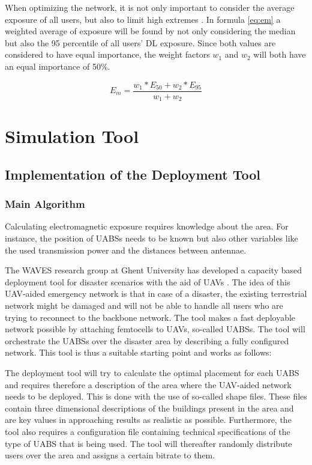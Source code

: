 When optimizing the network, it is not only important to consider the average exposure of all users, but also to limit high extremes \cite{J1}. 
In formula \ref{eq:em} a weighted average of exposure will be found by not only considering the median but also the 95 percentile of all users' DL exposure.
Since both values are considered to have equal importance, the weight factors $w_1$ and $w_2$ will both have an equal importance of 50\%. 

\begin{equation} 
E_m = \frac{w_1 * E_{50} + w_2 * E_{95}}{w_1 + w_2}
\label{eq:em}
\end{equation}


\section{Simulation Tool}

\subsection{Implementation of the Deployment Tool}
\label{sec:implementation:deploymenttool}
\subsubsection{Main Algorithm}

Calculating electromagnetic exposure requires knowledge about the area. 
For instance, the position of \gls{UABS}s needs to be known but also  other variables like
 the used transmission power and the distances between antennae.

The WAVES research group at Ghent University has developed a capacity based deployment tool for disaster scenarios with the aid of UAVs \cite{J2}.
The idea of this UAV-aided emergency network is that in case of a disaster, the existing terrestrial network might be damaged and will not be able 
to handle all users who are trying to reconnect to the backbone network. 
The tool makes a fast deployable network possible by attaching femtocells to UAVs, so-called \gls{UABS}s.
The tool will orchestrate the \gls{UABS}s over the disaster area by describing a fully configured network.
This tool is thus a suitable starting point and works as follows:

The deployment tool will try to calculate the optimal placement for each \gls{UABS} and requires therefore a description of the area where the UAV-aided network needs to 
be deployed. This is done with the use of so-called shape files. These files contain three dimensional descriptions of the buildings present in the area and are
key values in approaching results as realistic as possible. Furthermore, the tool also requires a configuration file containing technical specifications of the type of \gls{UABS} that is being used. 
The tool will thereafter randomly distribute users over the area and assigns a certain bitrate to them.

